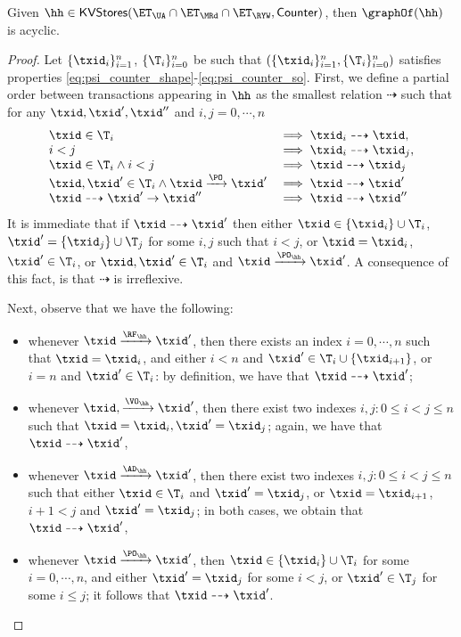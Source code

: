 \begin{corollary}
\label{cor:psi_counter_acyclic}
Given $\hh \in \mathsf{KVStores}(\ET_{\UA} \cap \ET_{\MRd} \cap \ET_{\RYW}, \mathsf{Counter})$, 
then $\graphOf(\hh)$ is acyclic.
\end{corollary}

\begin{proof}
Let $\{\txid_{i}\}_{i=1}^{n}$, $\{\T_{i}\}_{i=0}^{n}$ 
be such that $(\{\txid_{i}\}_{i=1}^{n}, \{\T_{i}\}_{i=0}^{n})$ 
satisfies properties \eqref{eq:psi_counter_shape}-\eqref{eq:psi_counter_so}. 
First, we define a partial order between transactions appearing in $\hh$ 
as the smallest relation $\dashrightarrow$ such that for any $\txid, \txid', \txid''$ and 
$i,j = 0,\cdots, n$
\[
\begin{array}{ll}
\txid \in \T_{i} &\implies \txid_{i} \dashrightarrow \txid,\\
i < j &\implies \txid_{i} \dashrightarrow \txid_{j},\\
\txid \in \T_{i} \wedge i < j & \implies \txid \dashrightarrow \txid_{j}\\
\txid, \txid' \in \T_{i} \wedge \txid \xrightarrow{\PO} \txid' &\implies \txid \dashrightarrow \txid'\\
\txid \dashrightarrow \txid' \rightarrow \txid'' &\implies \txid \dashrightarrow \txid''
\end{array}
\]
It is immediate that if $\txid \dashrightarrow \txid'$ then either $\txid \in \{\txid_{i}\} \cup \T_i$, 
$\txid' = \{\txid_{j}\} \cup \T_{j}$ for some $i,j$ such that $i < j$, or $\txid = \txid_{i}$, $\txid' \in \T_i$, 
or $\txid, \txid' \in \T_{i}$ and $\txid \xrightarrow{\PO_{\hh}} \txid'$. A consequence of this fact, 
is that $\dashrightarrow$ is irreflexive.

Next, observe that we have the following: 
\begin{itemize}
\item whenever $\txid \xrightarrow{\RF_{\hh}} \txid'$, then 
there exists an index $i = 0,\cdots, n$ such that $\txid = \txid_{i}$, 
and either $i < n$ and $\txid' \in \T_{i} \cup \{ \txid_{i+1} \}$, 
or $i = n$ and $\txid' \in \T_{i}$: by definition, we have that $\txid \dashrightarrow \txid'$;
\item whenever $\txid, \xrightarrow{\VO_{\hh}} \txid'$, 
then there exist two indexes $i, j: 0 \leq i < j \leq n$ such that 
$\txid = \txid_{i}, \txid' = \txid_{j}$; again, we have that $\txid \dashrightarrow \txid'$, 
\item whenever $\txid \xrightarrow{\AD_{\hh}} \txid'$, then 
there exist two indexes $i, j: 0 \leq i < j \leq n$ such that either 
$\txid \in \T_{i}$ and $\txid' = \txid_{j}$, or $\txid = \txid_{i+1}$, 
$i+1 < j$ and $\txid' = \txid_{j}$; in both cases, we obtain that $\txid \dashrightarrow \txid'$,
\item whenever $\txid \xrightarrow{\PO_{\hh}} \txid'$, then 
$\txid \in \{\txid_{i}\} \cup \T_{i}$ for some $i=0,\cdots,n$, 
and either $\txid' = \txid_{j}$ for some $i < j$,  or $\txid' \in \T_{j}$ for 
some $i \leq j$; it follows that $\txid \dashrightarrow \txid'$.
\end{itemize}


\end{proof}
